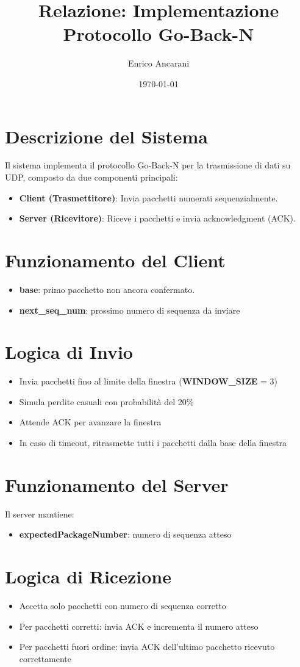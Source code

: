 \documentclass[a4paper,12pt]{article}
\title{Relazione: Implementazione Protocollo Go-Back-N}
\author{Enrico Ancarani}
\date{\today}
\begin{document}
\maketitle
\tableofcontents
\newpage
\section{Descrizione del Sistema}
Il sistema implementa il protocollo Go-Back-N per la trasmissione di dati su UDP, composto da due componenti principali:
\begin{itemize}
    \item \textbf{Client (Trasmettitore)}: Invia pacchetti numerati sequenzialmente.
    \item \textbf{Server (Ricevitore)}: Riceve i pacchetti e invia acknowledgment (ACK).
\end{itemize}
\section{Funzionamento del Client}
\begin{itemize}
    \item \textbf{base}: primo pacchetto non ancora confermato.
    \item \textbf{next\_seq\_num}: prossimo numero di sequenza da inviare
\end{itemize}
\section{Logica di Invio}
\begin{itemize}
    \item Invia pacchetti fino al limite della finestra (\textbf{WINDOW\_SIZE} = 3)
    \item Simula perdite casuali con probabilità del 20\%
    \item Attende ACK per avanzare la finestra
    \item In caso di timeout, ritrasmette tutti i pacchetti dalla base della finestra
\end{itemize}
\section{Funzionamento del Server}
Il server mantiene:
\begin{itemize}
    \item \textbf{expectedPackageNumber}: numero di sequenza atteso
\end{itemize}
\section{Logica di Ricezione}
\begin{itemize}
    \item Accetta solo pacchetti con numero di sequenza corretto
    \item Per pacchetti corretti: invia ACK e incrementa il numero atteso
    \item Per pacchetti fuori ordine: invia ACK dell'ultimo pacchetto ricevuto correttamente
\end{itemize}
\end{document}

